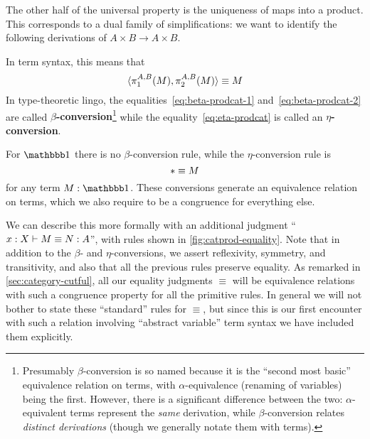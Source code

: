 The other half of the universal property is the uniqueness of maps into a product.
This corresponds to a dual family of simplifications: we want to identify the following derivations of $A\times B\to A\times B$.
In term syntax, this means that
\begin{equation}
  \pair{\pr1AB(M)}{\pr2AB(M)} \equiv M\label{eq:eta-prodcat}
\end{equation}
In type-theoretic lingo, the equalities~\eqref{eq:beta-prodcat-1} and~\eqref{eq:beta-prodcat-2} are called \textbf{$\beta$-conversion}\footnote{Presumably $\beta$-conversion is so named because it is the ``second most basic'' equivalence relation on terms, with $\alpha$-equivalence (renaming of variables) being the first.
However, there is a significant difference between the two: $\alpha$-equivalent terms represent the \emph{same} derivation, while $\beta$-conversion relates \emph{distinct derivations} (though we generally notate them with terms).} while the equality~\eqref{eq:eta-prodcat} is called an \textbf{$\eta$-conversion}.

For $\unit$ there is no $\beta$-conversion rule, while the $\eta$-conversion rule is
\begin{equation}\label{eq:eta-unit}
  \ttt \equiv M
\end{equation}
for any term $M:\unit$.
These conversions generate an equivalence relation on terms, which we also require to be a congruence for everything else.

We can describe this more formally with an additional judgment ``$x:X\vdash M\equiv N :A$'', with rules shown in  \cref{fig:catprod-equality}.
Note that in addition to the $\beta$- and $\eta$-conversions, we assert reflexivity, symmetry, and transitivity, and also that all the previous rules preserve equality.
As remarked in \cref{sec:category-cutful}, all our equality judgments $\equiv$ will be equivalence relations with such a congruence property for all the primitive rules.
In general we will not bother to state these ``standard'' rules for $\equiv$, but since this is our first encounter with such a relation involving ``abstract variable'' term syntax we have included them explicitly.

